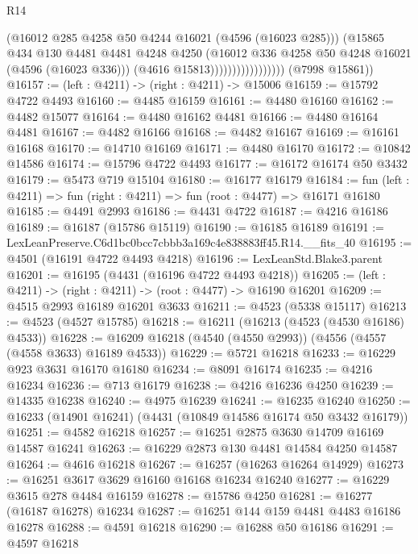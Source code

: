 \begin{lexlean}{R14}
\begin{coremodule}
                                    (@16012 @285 @4258 @50 @4244 @16021 (@4596 (@16023 @285)))
                                    (@15865
                                      @434
                                      @130
                                      @4481
                                      @4481
                                      @4248
                                      @4250
                                      (@16012 @336 @4258 @50 @4248 @16021 (@4596 (@16023 @336)))
                                      (@4616 @15813)))))))))))))))))
      (@7998 @15861))
@16157 := (left : @4211) -> (right : @4211) -> @15006
@16159 := @15792 @4722 @4493
@16160 := @4485 @16159
@16161 := @4480 @16160
@16162 := @4482 @15077
@16164 := @4480 @16162 @4481
@16166 := @4480 @16164 @4481
@16167 := @4482 @16166
@16168 := @4482 @16167
@16169 := @16161 @16168
@16170 := @14710 @16169
@16171 := @4480 @16170
@16172 := @10842 @14586
@16174 := @15796 @4722 @4493
@16177 := @16172 @16174 @50 @3432
@16179 := @5473 @719 @15104
@16180 := @16177 @16179
@16184 := fun (left : @4211) => fun (right : @4211) => fun (root : @4477) => @16171 @16180
@16185 := @4491 @2993
@16186 := @4431 @4722
@16187 := @4216 @16186
@16189 := @16187 (@15786 @15119)
@16190 := @16185 @16189
@16191 := LexLeanPreserve.C6d1bc0bcc7cbbb3a169c4e838883ff45.R14.__fits_40
@16195 := @4501 (@16191 @4722 @4493 @4218)
@16196 := LexLeanStd.Blake3.parent
@16201 := @16195 (@4431 (@16196 @4722 @4493 @4218))
@16205 := (left : @4211) -> (right : @4211) -> (root : @4477) -> @16190 @16201
@16209 := @4515 @2993 @16189 @16201 @3633
@16211 := @4523 (@5338 @15117)
@16213 := @4523 (@4527 @15785)
@16218 := @16211 (@16213 (@4523 (@4530 @16186) @4533))
@16228 := @16209 @16218 (@4540 (@4550 @2993)) (@4556 (@4557 (@4558 @3633) @16189 @4533))
@16229 := @5721 @16218
@16233 := @16229 @923 @3631 @16170 @16180
@16234 := @8091 @16174
@16235 := @4216 @16234
@16236 := @713 @16179
@16238 := @4216 @16236 @4250
@16239 := @14335 @16238
@16240 := @4975 @16239
@16241 := @16235 @16240
@16250 := @16233 (@14901 @16241) (@4431 (@10849 @14586 @16174 @50 @3432 @16179))
@16251 := @4582 @16218
@16257 := @16251 @2875 @3630 @14709 @16169 @14587 @16241
@16263 := @16229 @2873 @130 @4481 @14584 @4250 @14587
@16264 := @4616 @16218
@16267 := @16257 (@16263 @16264 @14929)
@16273 := @16251 @3617 @3629 @16160 @16168 @16234 @16240
@16277 := @16229 @3615 @278 @4484 @16159
@16278 := @15786 @4250
@16281 := @16277 (@16187 @16278) @16234
@16287 := @16251 @144 @159 @4481 @4483 @16186 @16278
@16288 := @4591 @16218
@16290 := @16288 @50 @16186
@16291 := @4597 @16218

\end{coremodule}
\end{lexlean}
